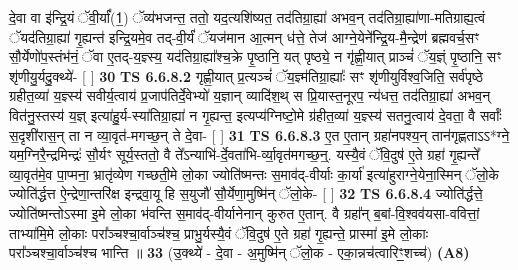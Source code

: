 \documentclass[17pt]{extarticle}
\begin{document}
                  दे॒वा वा इ॑न्द्रि॒यं ॅवी॒र्यां᳚(1॒) ॅव्य॑भजन्त॒ ततो॒ यद॒त्यशि॑ष्यत॒ तद॑तिग्रा॒ह्या॑ अभव॒न् तद॑तिग्रा॒ह्या॑णा-मतिग्राह्य॒त्वं ॅयद॑तिग्रा॒ह्या॑ गृ॒ह्यन्त॑ इन्द्रि॒यमे॒व तद्-वी॒र्यं॑ ॅयज॑मान आ॒त्मन् ध॑त्ते॒ तेज॑ आग्ने॒येने᳚न्द्रि॒य-मै॒न्द्रेण॑ ब्रह्मवर्च॒सꣳ सौ॒र्येणो॑प॒स्तंभ॑नं॒ ॅवा ए॒तद्-य॒ज्ञ्स्य॒ यद॑तिग्रा॒ह्या᳚श्च॒क्रे पृ॒ष्ठानि॒ यत् पृष्ठ्ये॒ न गृ॑ह्णी॒यात् प्राञ्चं॑ ॅय॒ज्ञ्ं पृ॒ष्ठानि॒ सꣳ शृ॑णीयु॒र्यदु॒क्थ्ये॑- [  ] \textbf{  30} \newline
                  \newline
                                \textbf{ TS 6.6.8.2} \newline
                  गृह्णी॒यात् प्र॒त्यञ्चं॑ ॅय॒ज्ञ्म॑तिग्रा॒ह्याः᳚ सꣳ शृ॑णीयुर्विश्व॒जिति॒ सर्व॑पृष्ठे ग्रहीत॒व्या॑ य॒ज्ञ्स्य॑ सवीर्य॒त्वाय॑ प्र॒जाप॑तिर्दे॒वेभ्यो॑ य॒ज्ञान् व्यादि॑श॒थ् स प्रि॒यास्त॒नूरप॒ न्य॑धत्त॒ तद॑तिग्रा॒ह्या॑ अभव॒न् वित॑नु॒स्तस्य॑ य॒ज्ञ् इत्या॑हु॒र्य-स्या॑तिग्रा॒ह्या॑ न गृ॒ह्यन्त॒ इत्यप्य॑ग्निष्टो॒मे ग्र॑हीत॒व्या॑ य॒ज्ञ्स्य॑ सतनु॒त्वाय॑ दे॒वता॒ वै सर्वाः᳚ स॒दृशी॑रास॒न् ता न व्या॒वृत॑-मगच्छ॒न् ते दे॒वा- [  ] \textbf{  31} \newline
                  \newline
                                \textbf{ TS 6.6.8.3} \newline
                  ए॒त ए॒तान् ग्रहा॑नपश्य॒न् तान॑गृह्णताऽऽ*ग्ने॒ यम॒ग्निरै॒न्द्रमिन्द्रः॑ सौ॒र्यꣳ सूर्य॒स्ततो॒ वै ते᳚ऽन्याभि॑-र्दे॒वता॑भि-र्व्या॒वृत॑मगच्छ॒न्॒. यस्यै॒वं ॅवि॒दुष॑ ए॒ते ग्रहा॑ गृ॒ह्यन्ते᳚ व्या॒वृत॑मे॒व पा॒प्मना॒ भ्रातृ॑व्येण गच्छती॒मे लो॒का ज्योति॑ष्मन्तः स॒माव॑द्-वीर्याः का॒र्या॑ इत्या॑हुराग्ने॒येना॒स्मिन् ॅलो॒के ज्योति॑र्द्धत्त ऐ॒न्द्रेणा॒न्तरि॑क्ष इन्द्रवा॒यू हि स॒युजौ॑ सौ॒र्येणा॒मुष्मि॑न् ॅलो॒के- [  ] \textbf{  32} \newline
                  \newline
                                \textbf{ TS 6.6.8.4} \newline
                  ज्योति॑र्द्धत्ते॒ ज्योति॑ष्मन्तोऽस्मा इ॒मे लो॒का भ॑वन्ति स॒माव॑द्-वीर्यानेनान् कुरुत ए॒तान्. वै ग्रहा᳚न् ब॒बां-वि॒श्वव॑यसा-ववित्तां॒ ताभ्या॑मि॒मे लो॒काः परा᳚ञ्चश्चा॒र्वाञ्च॑श्च॒ प्राभु॒र्यस्यै॒वं ॅवि॒दुष॑ ए॒ते ग्रहा॑ गृ॒ह्यन्ते॒ प्रास्मा॑ इ॒मे लो॒काः परा᳚ञ्चश्चा॒र्वाञ्च॑श्च भान्ति ॥ \textbf{  33 } \newline
                  \newline
                      (उ॒क्थ्ये॑ - दे॒वा - अ॒मुष्मि॑न् ॅलो॒क - एका॒न्नच॑त्वारिꣳ॒॒शच्च॑)  \textbf{(A8)} \newline \newline
\end{document}
